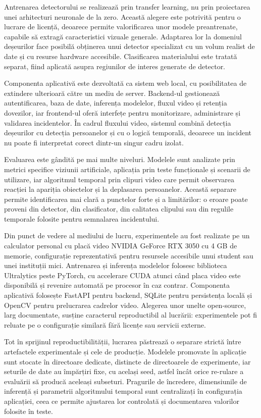 Antrenarea detectorului se realizează prin transfer learning, nu prin proiectarea unei arhitecturi neuronale de la zero. Această alegere este potrivită pentru o lucrare de licență, deoarece permite valorificarea unor modele preantrenate, capabile să extragă caracteristici vizuale generale. Adaptarea lor la domeniul deșeurilor face posibilă obținerea unui detector specializat cu un volum realist de date și cu resurse hardware accesibile. Clasificarea materialului este tratată separat, fiind aplicată asupra regiunilor de interes generate de detector.

Componenta aplicativă este dezvoltată ca sistem web local, cu posibilitatea de extindere ulterioară către un mediu de server. Backend-ul gestionează autentificarea, baza de date, inferența modelelor, fluxul video și retenția dovezilor, iar frontend-ul oferă interfețe pentru monitorizare, administrare și validarea incidentelor. În cadrul fluxului video, sistemul combină detecția deșeurilor cu detecția persoanelor și cu o logică temporală, deoarece un incident nu poate fi interpretat corect dintr-un singur cadru izolat.

Evaluarea este gândită pe mai multe niveluri. Modelele sunt analizate prin metrici specifice viziunii artificiale, aplicația prin teste funcționale și scenarii de utilizare, iar algoritmul temporal prin clipuri video care permit observarea reacției la apariția obiectelor și la deplasarea persoanelor. Această separare permite identificarea mai clară a punctelor forte și a limitărilor: o eroare poate proveni din detector, din clasificator, din calitatea clipului sau din regulile temporale folosite pentru semnalarea incidentului.

Din punct de vedere al mediului de lucru, experimentele au fost realizate pe un calculator personal cu placă video NVIDIA GeForce RTX 3050 cu 4 GB de memorie, configurație reprezentativă pentru resursele accesibile unui student sau unei instituții mici. Antrenarea și inferența modelelor folosesc biblioteca Ultralytics peste PyTorch, cu accelerare CUDA atunci când placa video este disponibilă și revenire automată pe procesor în caz contrar. Componenta aplicativă folosește FastAPI pentru backend, SQLite pentru persistența locală și OpenCV pentru prelucrarea cadrelor video. Alegerea unor unelte open-source, larg documentate, susține caracterul reproductibil al lucrării: experimentele pot fi reluate pe o configurație similară fără licențe sau servicii externe.

Tot în sprijinul reproductibilității, lucrarea păstrează o separare strictă între artefactele experimentale și cele de producție. Modelele promovate în aplicație sunt stocate în directoare dedicate, distincte de directoarele de experimente, iar seturile de date au împărțiri fixe, cu același seed, astfel încât orice re-rulare a evaluării să producă aceleași subseturi. Pragurile de încredere, dimensiunile de inferență și parametrii algoritmului temporal sunt centralizați în configurația aplicației, ceea ce permite ajustarea lor controlată și documentarea valorilor folosite în teste.

